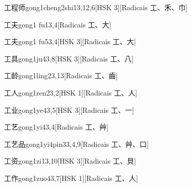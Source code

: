 \begin{entry}{工程师}{gong1cheng2shi1}{3,12,6}[HSK 3][Radicais ⼯、⽲、⼱]
\end{entry}

\begin{entry}{工夫}{gong1 fu1}{3,4}[Radicais ⼯、⼤]
\end{entry}

\begin{entry}{工夫}{gong1 fu5}{3,4}[HSK 3][Radicais ⼯、⼤]
\end{entry}

\begin{entry}{工具}{gong1ju4}{3,8}[HSK 3][Radicais ⼯、⼋]
\end{entry}

\begin{entry}{工龄}{gong1ling2}{3,13}[Radicais ⼯、⿒]
\end{entry}

\begin{entry}{工人}{gong1ren2}{3,2}[HSK 1][Radicais ⼯、⼈]
\end{entry}

\begin{entry}{工业}{gong1ye4}{3,5}[HSK 3][Radicais ⼯、⼀]
\end{entry}

\begin{entry}{工艺}{gong1yi4}{3,4}[Radicais ⼯、⾋]
\end{entry}

\begin{entry}{工艺品}{gong1yi4pin3}{3,4,9}[Radicais ⼯、⾋、⼝]
\end{entry}

\begin{entry}{工资}{gong1zi1}{3,10}[HSK 3][Radicais ⼯、⾙]
\end{entry}

\begin{entry}{工作}{gong1zuo4}{3,7}[HSK 1][Radicais ⼯、⼈]
\end{entry}

